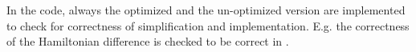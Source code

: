 
In the code, always the optimized and the un-optimized version are implemented to check for correctness of simplification and implementation.
E.g. the correctness of the Hamiltonian difference is checked to be correct in .
